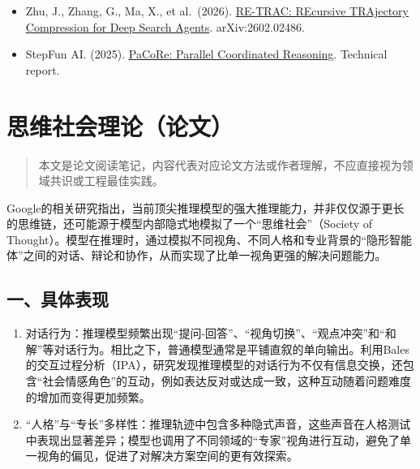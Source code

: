 \begin{itemize}
\tightlist
\item
  Zhu, J., Zhang, G., Ma, X., et al.~(2026). \href{https://arxiv.org/abs/2602.02486}{RE-TRAC: REcursive TRAjectory Compression for Deep Search Agents}. arXiv:2602.02486.
\item
  StepFun AI. (2025). \href{https://github.com/stepfun-ai/PaCoRe/blob/main/pacore_report.pdf}{PaCoRe: Parallel Coordinated Reasoning}. Technical report.
\end{itemize}

\clearpage

\hypertarget{ux601dux7ef4ux793eux4f1aux7406ux8bbaux8bbaux6587}{%
\section{思维社会理论（论文）}\label{ux601dux7ef4ux793eux4f1aux7406ux8bbaux8bbaux6587}}

\begin{quote}
本文是论文阅读笔记，内容代表对应论文方法或作者理解，不应直接视为领域共识或工程最佳实践。
\end{quote}

Google的相关研究指出，当前顶尖推理模型的强大推理能力，并非仅仅源于更长的思维链，还可能源于模型内部隐式地模拟了一个``思维社会''（Society of Thought）。模型在推理时，通过模拟不同视角、不同人格和专业背景的``隐形智能体''之间的对话、辩论和协作，从而实现了比单一视角更强的解决问题能力。

\hypertarget{ux4e00ux5177ux4f53ux8868ux73b0}{%
\subsection{一、具体表现}\label{ux4e00ux5177ux4f53ux8868ux73b0}}

\begin{enumerate}
\def\labelenumi{\arabic{enumi}.}
\item
  对话行为：推理模型频繁出现``提问-回答''、``视角切换''、``观点冲突''和``和解''等对话行为。相比之下，普通模型通常是平铺直叙的单向输出。利用Bales的交互过程分析（IPA），研究发现推理模型的对话行为不仅有信息交换，还包含``社会情感角色''的互动，例如表达反对或达成一致，这种互动随着问题难度的增加而变得更加频繁。
\item
  ``人格''与``专长''多样性：推理轨迹中包含多种隐式声音，这些声音在人格测试中表现出显著差异；模型也调用了不同领域的``专家''视角进行互动，避免了单一视角的偏见，促进了对解决方案空间的更有效探索。
\end{enumerate}

